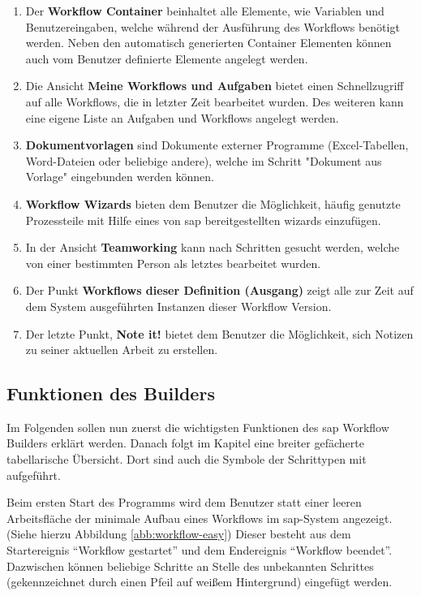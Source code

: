 \begin{enumerate}
	\item Der \textbf{Workflow Container} beinhaltet alle Elemente, wie Variablen und Benutzereingaben, welche während der Ausführung des Workflows benötigt werden. Neben den automatisch generierten Container Elementen können auch vom Benutzer definierte Elemente angelegt werden.
	\item Die Ansicht \textbf{Meine Workflows und Aufgaben} bietet einen Schnellzugriff auf alle Workflows, die in letzter Zeit bearbeitet wurden. Des weiteren kann eine eigene Liste an Aufgaben und Workflows angelegt werden.
	\item \textbf{Dokumentvorlagen} sind Dokumente externer Programme (Excel-Tabellen, Word-Dateien oder beliebige andere), welche im Schritt "Dokument aus Vorlage" eingebunden werden können. 
	\item \textbf{Workflow Wizards} bieten dem Benutzer die Möglichkeit, häufig genutzte Prozessteile mit Hilfe eines von \gls{sap} bereitgestellten \gls{wizard}s einzufügen.
	\item In der Ansicht \textbf{Teamworking} kann nach Schritten gesucht werden, welche von einer bestimmten Person als letztes bearbeitet wurden.
	\item Der Punkt \textbf{Workflows dieser Definition (Ausgang)} zeigt alle zur Zeit auf dem System ausgeführten Instanzen dieser Workflow Version.
	\item Der letzte Punkt, \textbf{Note it!} bietet dem Benutzer die Möglichkeit, sich Notizen zu seiner aktuellen Arbeit zu erstellen.
\end{enumerate}



\subsection{Funktionen des Builders}
\label{sec:builder-funktionen}
Im Folgenden sollen nun zuerst die wichtigsten Funktionen des \gls{sap} Workflow Builders erklärt werden. Danach folgt im Kapitel  eine breiter gefächerte tabellarische Übersicht. Dort sind auch die Symbole der Schrittypen mit aufgeführt. 

Beim ersten Start des Programms wird dem Benutzer statt einer leeren Arbeitsfläche der minimale Aufbau eines Workflows im \gls{sap}-System angezeigt. (Siehe hierzu Abbildung \ref{abb:workflow-easy}) Dieser besteht aus dem Startereignis "`Workflow gestartet"' und dem Endereignis "`Workflow beendet"'. Dazwischen können beliebige Schritte an Stelle des unbekannten Schrittes (gekennzeichnet durch einen Pfeil auf weißem Hintergrund) eingefügt werden.


